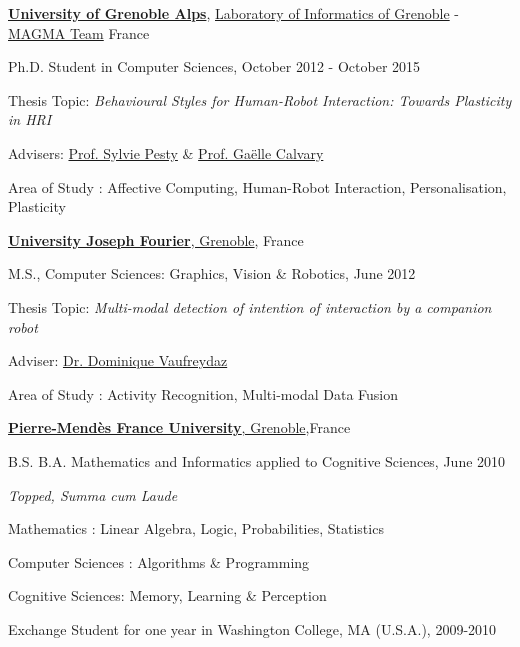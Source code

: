 \documentclass[10pt]{article}
\begin{document}
\href{http://www.univ-grenoble-alpes.fr/}{\textbf{University of Grenoble Alps}}, \href{http://liglab.fr}{Laboratory of Informatics of Grenoble} - \href{http://magma.imag.fr}{MAGMA Team} France
\begin{outerlist}

\item[] Ph.D. Student in Computer Sciences, October 2012 - October 2015
        \begin{innerlist}
        \item Thesis Topic: \emph{Behavioural Styles for Human-Robot Interaction: Towards Plasticity in HRI}
        \item Advisers:
              \href{http://magma.imag.fr/content/sylvie-pesty}
                   {Prof. Sylvie Pesty} \& 
              \href{http://iihm.imag.fr/calvary/}
                   {Prof. Gaëlle Calvary}
        \item Area of Study : Affective Computing, Human-Robot Interaction, Personalisation, Plasticity
        \end{innerlist}

\end{outerlist}
\vspace{0.5cm}
\href{https://www.ujf-grenoble.fr/?language=en}{\textbf{University Joseph Fourier}, Grenoble}, France
\begin{outerlist}
\item[] M.S.,
             {Computer Sciences: Graphics, Vision \& Robotics}, June 2012
        \begin{innerlist}
        \item Thesis Topic: \emph{Multi-modal detection of intention of interaction by a companion robot}
        \item Adviser:
              \href{https://team.inria.fr/prima/vaufreydaz/}
                   {Dr. Dominique Vaufreydaz}
        \item Area of Study : Activity Recognition, Multi-modal Data Fusion
        \end{innerlist}

\end{outerlist}
\vspace{0.5cm}
\href{http://www.upmf-grenoble.fr/}{\textbf{ Pierre-Mendès France University}, Grenoble},France
\begin{outerlist}

\item[] B.S. B.A. Mathematics and Informatics applied to Cognitive Sciences, June 2010
        \begin{innerlist}
        \item \emph{Topped, Summa cum Laude}
        \item Mathematics : Linear Algebra, Logic, Probabilities, Statistics
        \item Computer Sciences : Algorithms \& Programming
        \item Cognitive Sciences: Memory, Learning \& Perception
        \end{innerlist}
        Exchange Student for one year in Washington College, MA (U.S.A.), 2009-2010

\end{outerlist}
\end{document}
